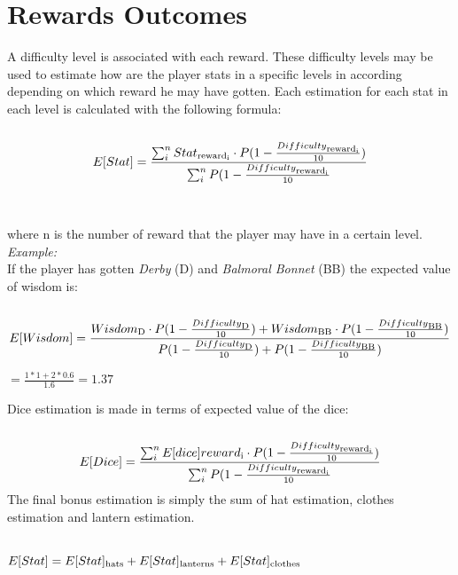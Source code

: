 \section{Rewards Outcomes}
A difficulty level is associated with each reward. These difficulty levels may be used to estimate how are the player stats in a specific levels in according depending on which reward he may have gotten. Each estimation for each stat in each level is calculated with the following formula: \\\\
\begin{equation}
  E[Stat]= \frac{\sum_{i}^{n} Stat\textsubscript{reward\textsubscript{i}}
  \cdot
  P(1-\frac{Difficulty\textsubscript{reward\textsubscript{i}}}{10})}
  {\sum_{i}^{n}P(1-\frac{Difficulty\textsubscript{reward\textsubscript{i}}}{10}}
\end{equation}
\\\\
where n is the number of reward that the player may have in a certain level.\\
\textit{Example:}\\
If the player has gotten \textit{Derby} (D) and \textit{Balmoral Bonnet} (BB) the expected value of wisdom is:\\\\
\begin{equation}
E[Wisdom]= \frac{Wisdom\textsubscript{D} \cdot P(1-\frac{Difficulty\textsubscript{D}}{10}) +
  Wisdom\textsubscript{BB} \cdot P(1-\frac{Difficulty\textsubscript{BB}}{10})}
{P(1-\frac{Difficulty\textsubscript{D}}{10})+P(1-\frac{Difficulty\textsubscript{BB}}{10})} 
\end{equation}
\begin{center}
  $= \frac{1*1 + 2*0.6}{1.6} =1.37$
  \end{center}

Dice estimation is made in terms of expected value of the dice:\\\\
\begin{equation}
  E[Dice]= \frac{\sum_{i}^{n} E[dice]{reward\textsubscript{i}}
  \cdot
  P(1-\frac{Difficulty\textsubscript{reward\textsubscript{i}}}{10})}
  {\sum_{i}^{n}P(1-\frac{Difficulty\textsubscript{reward\textsubscript{i}}}{10}}
\end{equation}
The final bonus estimation is simply the sum of hat estimation, clothes estimation and lantern estimation.\\\\
\begin{center}
  $E[Stat]=E[Stat]\textsubscript{hats} + E[Stat]\textsubscript{lanterns} + E[Stat]\textsubscript{clothes}$
  \end{center}

